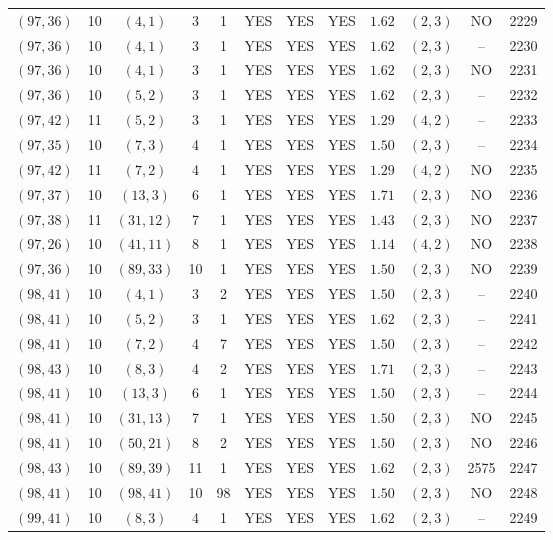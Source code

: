 \begin{longtable}{|c|c|c|c|c|c|c|c|c|c|c|c|}
$(97,36)$ & 10 & $(4,1)$ & 3 & 1 & YES & YES & YES & $1.62$ & $(2,3)$ & NO & 2229\\
$(97,36)$ & 10 & $(4,1)$ & 3 & 1 & YES & YES & YES & $1.62$ & $(2,3)$ & -- & 2230\\
$(97,36)$ & 10 & $(4,1)$ & 3 & 1 & YES & YES & YES & $1.62$ & $(2,3)$ & NO & 2231\\
$(97,36)$ & 10 & $(5,2)$ & 3 & 1 & YES & YES & YES & $1.62$ & $(2,3)$ & -- & 2232\\
$(97,42)$ & 11 & $(5,2)$ & 3 & 1 & YES & YES & YES & $1.29$ & $(4,2)$ & -- & 2233\\
$(97,35)$ & 10 & $(7,3)$ & 4 & 1 & YES & YES & YES & $1.50$ & $(2,3)$ & -- & 2234\\
$(97,42)$ & 11 & $(7,2)$ & 4 & 1 & YES & YES & YES & $1.29$ & $(4,2)$ & NO & 2235\\
$(97,37)$ & 10 & $(13,3)$ & 6 & 1 & YES & YES & YES & $1.71$ & $(2,3)$ & NO & 2236\\
$(97,38)$ & 11 & $(31,12)$ & 7 & 1 & YES & YES & YES & $1.43$ & $(2,3)$ & NO & 2237\\
$(97,26)$ & 10 & $(41,11)$ & 8 & 1 & YES & YES & YES & $1.14$ & $(4,2)$ & NO & 2238\\
$(97,36)$ & 10 & $(89,33)$ & 10 & 1 & YES & YES & YES & $1.50$ & $(2,3)$ & NO & 2239\\
$(98,41)$ & 10 & $(4,1)$ & 3 & 2 & YES & YES & YES & $1.50$ & $(2,3)$ & -- & 2240\\
$(98,41)$ & 10 & $(5,2)$ & 3 & 1 & YES & YES & YES & $1.62$ & $(2,3)$ & -- & 2241\\
$(98,41)$ & 10 & $(7,2)$ & 4 & 7 & YES & YES & YES & $1.50$ & $(2,3)$ & -- & 2242\\
$(98,43)$ & 10 & $(8,3)$ & 4 & 2 & YES & YES & YES & $1.71$ & $(2,3)$ & -- & 2243\\
$(98,41)$ & 10 & $(13,3)$ & 6 & 1 & YES & YES & YES & $1.50$ & $(2,3)$ & -- & 2244\\
$(98,41)$ & 10 & $(31,13)$ & 7 & 1 & YES & YES & YES & $1.50$ & $(2,3)$ & NO & 2245\\
$(98,41)$ & 10 & $(50,21)$ & 8 & 2 & YES & YES & YES & $1.50$ & $(2,3)$ & NO & 2246\\
$(98,43)$ & 10 & $(89,39)$ & 11 & 1 & YES & YES & YES & $1.62$ & $(2,3)$ & 2575 & 2247\\
$(98,41)$ & 10 & $(98,41)$ & 10 & 98 & YES & YES & YES & $1.50$ & $(2,3)$ & NO & 2248\\
$(99,41)$ & 10 & $(8,3)$ & 4 & 1 & YES & YES & YES & $1.62$ & $(2,3)$ & -- & 2249\\

\end{longtable}
